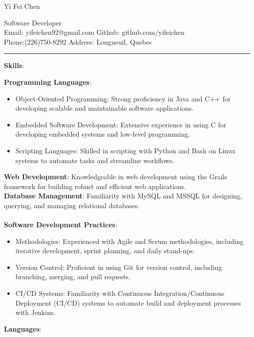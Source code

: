 \documentclass[letterpaper]{article}
\begin{document}
\begin{center}
\begin{LARGE}
 Yi Fei Chen \\
\end{LARGE}
\begin{large}
Software Developer\\
Email: yifeichen92@gmail.com
\hfill
Github: github.com/yifeichen \\
Phone:(226)750-8292 
\hfill	
Address: Longueuil, Quebec
\end{large}
\end{center}


\par\noindent\rule{\textwidth}{0.4pt}



\begin{large}
\textbf{Skills}:\\
\end{large}
\textbf{Programming Languages}:
\begin{itemize}[leftmargin=10mm]
\item Object-Oriented Programming: Strong proficiency in Java and C++ for developing scalable and maintainable software applications.
\item Embedded Software Development: Extensive experience in using C for developing embedded systems and low-level programming.
\item Scripting Languages: Skilled in scripting with Python and Bash on Linux systems to automate tasks and streamline workflows.
\end{itemize}
\textbf{Web Development}: Knowledgeable in web development using the Grails framework for building robust and efficient web applications.\\

\textbf{Database Management}: Familiarity with MySQL and MSSQL for designing, querying, and managing relational databases. \\ \\
\textbf{Software Development Practices}:
\begin{itemize}[leftmargin=10mm]
\item Methodologies: Experienced with Agile and Scrum methodologies, including iterative development, sprint planning, and daily stand-ups.
\item Version Control: Proficient in using Git for version control, including branching, merging, and pull requests.
\item CI/CD Systems: Familiarity with Continuous Integration/Continuous Deployment (CI/CD) systems to automate build and deployment processes with Jenkins.
\end{itemize}
\textbf{Languages}:
\end{document}
